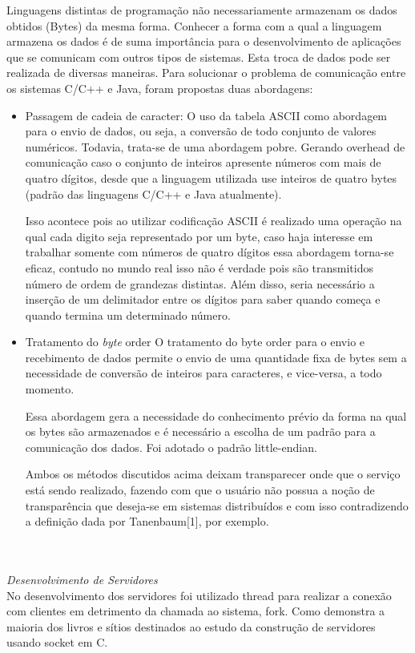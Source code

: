 \documentclass[12pt,a4paper]{article}
\begin{document}
Linguagens distintas de programação não necessariamente armazenam os dados obtidos (Bytes) da mesma forma. Conhecer a forma com a qual a linguagem armazena os dados é de suma importância para o desenvolvimento de aplicações que se comunicam com outros tipos de sistemas.
Esta troca de dados pode ser realizada de diversas maneiras. Para solucionar o problema de comunicação entre os sistemas C/C++ e Java, foram propostas duas abordagens:
\begin{itemize}
\item{Passagem de cadeia de caracter:}
O uso da tabela ASCII como abordagem para o envio de dados, ou seja, a conversão de todo conjunto de valores numéricos. Todavia, trata-se de uma abordagem pobre. Gerando overhead de comunicação caso o conjunto de inteiros apresente números com mais de quatro dígitos, desde que a linguagem utilizada use inteiros de quatro bytes (padrão das linguagens C/C++ e Java atualmente).

Isso acontece pois ao utilizar codificação ASCII é realizado uma operação na qual cada digito seja representado por um byte, caso haja interesse em trabalhar somente com números de quatro dígitos essa abordagem torna-se eficaz, contudo no mundo real isso não é verdade pois são transmitidos número de ordem de grandezas distintas. Além disso, seria necessário a inserção de um delimitador entre os dígitos para saber quando começa e quando termina um determinado número.
\item{Tratamento do \textit{byte} order}
O tratamento do byte order para o envio e recebimento de dados permite o envio de uma quantidade fixa de bytes sem a necessidade de conversão de inteiros para caracteres, e vice-versa, a todo momento.

Essa abordagem gera a necessidade do conhecimento prévio da forma na qual os bytes são armazenados e é necessário a escolha de um padrão para a comunicação dos dados. Foi adotado o padrão little-endian.

Ambos os métodos discutidos acima deixam transparecer onde que o serviço está sendo realizado, fazendo com que o usuário não possua a noção de transparência que deseja-se em sistemas distribuídos e com isso contradizendo a definição dada por Tanenbaum[1], por exemplo.
\end{itemize}
\\\\
\textit{\Large{Desenvolvimento de Servidores}}
\\

No desenvolvimento dos servidores foi utilizado thread para realizar a conexão com clientes em detrimento da chamada ao sistema, fork. Como demonstra a maioria dos livros e sítios destinados ao estudo da construção de servidores usando socket em C.
\end{document}
